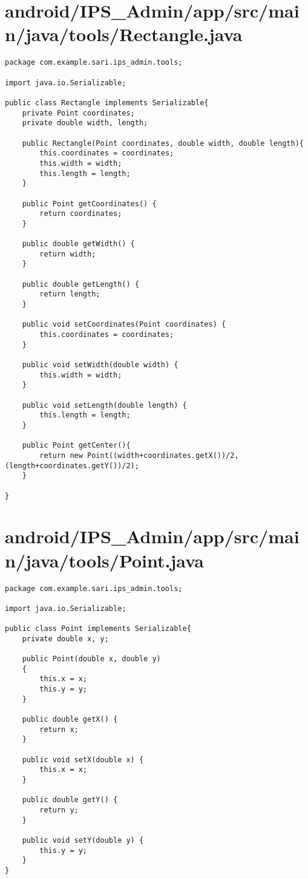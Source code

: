 \section{android/IPS\_Admin/app/src/main/java/tools/Rectangle.java}
\begin{lstlisting}package com.example.sari.ips_admin.tools;

import java.io.Serializable;

public class Rectangle implements Serializable{
    private Point coordinates;
    private double width, length;

    public Rectangle(Point coordinates, double width, double length){
        this.coordinates = coordinates;
        this.width = width;
        this.length = length;
    }

    public Point getCoordinates() {
        return coordinates;
    }

    public double getWidth() {
        return width;
    }

    public double getLength() {
        return length;
    }

    public void setCoordinates(Point coordinates) {
        this.coordinates = coordinates;
    }

    public void setWidth(double width) {
        this.width = width;
    }

    public void setLength(double length) {
        this.length = length;
    }

    public Point getCenter(){
        return new Point((width+coordinates.getX())/2,(length+coordinates.getY())/2);
    }

}
\end{lstlisting}
\newpage
\section{android/IPS\_Admin/app/src/main/java/tools/Point.java}
\begin{lstlisting}package com.example.sari.ips_admin.tools;

import java.io.Serializable;

public class Point implements Serializable{
    private double x, y;

    public Point(double x, double y)
    {
        this.x = x;
        this.y = y;
    }

    public double getX() {
        return x;
    }

    public void setX(double x) {
        this.x = x;
    }

    public double getY() {
        return y;
    }

    public void setY(double y) {
        this.y = y;
    }
}
\end{lstlisting}
\newpage
